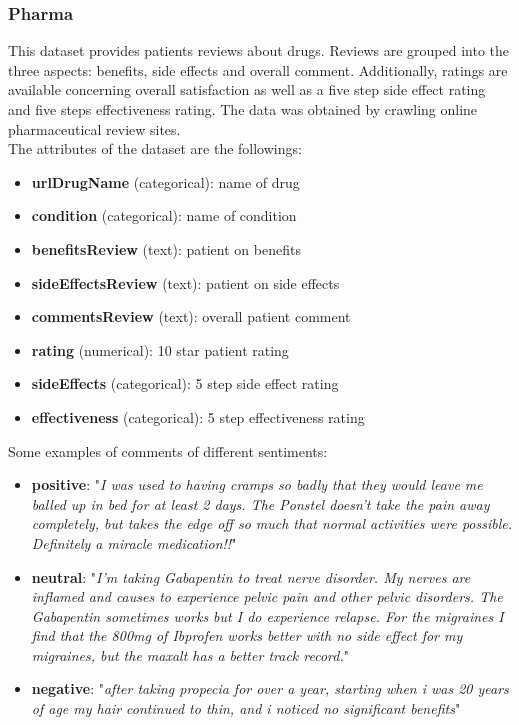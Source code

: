\subsubsection{Pharma \cite{GraBer:2018:ASA:3194658.3194677}}
This dataset provides patients reviews about drugs. Reviews are grouped into the three aspects: benefits, side effects and overall comment. Additionally, ratings are available concerning overall satisfaction as well as a five step side effect rating and five steps effectiveness rating. The data was obtained by crawling online pharmaceutical review sites.\\
The attributes of the dataset are the followings:
\begin{itemize}
	\item \textbf{urlDrugName} (categorical): name of drug 
	\item \textbf{condition} (categorical): name of condition 
	\item \textbf{benefitsReview} (text): patient on benefits 
	\item \textbf{sideEffectsReview} (text): patient on side effects 
	\item \textbf{commentsReview} (text): overall patient comment 
	\item \textbf{rating} (numerical): 10 star patient rating 
	\item \textbf{sideEffects} (categorical): 5 step side effect rating 
	\item \textbf{effectiveness} (categorical): 5 step effectiveness rating
\end{itemize}

Some examples of comments of different sentiments:
\begin{itemize}
	\item \textbf{positive}: "\textit{I was used to having cramps so badly that they would leave me balled up in bed for at least 2 days.  The Ponstel doesn't take the pain away completely, but takes the edge off so much that normal activities were possible. Definitely a miracle medication!!}"
	\item \textbf{neutral}: "\textit{I'm taking Gabapentin to treat nerve disorder. My nerves are inflamed and causes to experience pelvic pain and other pelvic disorders. The Gabapentin sometimes works but I do experience relapse.	For the migraines I find that the 800mg of Ibprofen works better with no side effect for my migraines, but the maxalt has a better track record.}"
	\item \textbf{negative}: "\textit{after taking propecia for over a year, starting when i was 20 years of age my hair continued to thin, and i noticed no significant benefits}"
\end{itemize}

